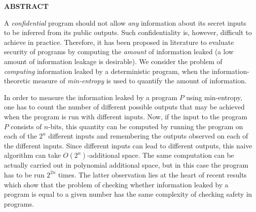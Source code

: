 \newpage
{}

\centerline{\bf \large ABSTRACT}
\vskip 10mm %
A \emph{confidential} program should not allow \emph{any} information about its secret inputs to be inferred from its public outputs. Such confidentiality is, however, difficult to achieve in practice. %
Therefore, it has been proposed in literature to evaluate security of programs by computing the \emph{amount} of information leaked (a low amount of information leakage is desirable). 
We consider the problem of \emph{computing} 
information leaked by a deterministic  program,  when the information-theoretic measure of \emph{min-entropy} is used to quantify the amount of information. 

In order to measure the information leaked by a program $P$ using min-entropy, one has to count the number of different possible outputs that may be achieved when the program is run with different inputs.  %
Now, if the  input to the program $P$ consists of $n$-bits, this quantity can be computed by running the program on each of the  $2^n$ different inputs and remembering the outputs observed on each of the different inputs. Since different inputs can lead to different outputs, this naive algorithm can take $O(2^n)$-additional space.  The same computation can be actually carried out in polynomial additional space,   but in this case the program has to be run  $2^{2n}$ times.  The latter observation lies at the heart of  recent results which show that the problem of checking whether information leaked by a program is equal to a given number has the same complexity of checking safety in  programs.  



